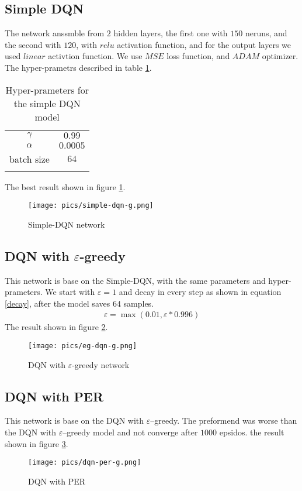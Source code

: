 \documentclass{article}
\begin{document}
	\subsection{Simple DQN}
	The network anssmble from $ 2 $ hidden layers, the first one with $ 150 $ neruns, and the second with $ 120 $, with $ relu$  activation function, and for the output layers we used $ linear $ activtion function.  We use $ MSE $ loss function, and $ ADAM $ optimizer. The hyper-prametrs described in table \ref{simple-dqn-hp}.
	\begin{table}[h!]
		\centering
		\begin{tabular}{@{}cc@{}}
			\toprule
			$\gamma$   & $0.99$   \\ 
			$\alpha$   & $0.0005$ \\
			batch size & $64$       \\ \bottomrule \\
		\end{tabular}
		\caption{Hyper-prameters for the simple DQN model}
		\label{simple-dqn-hp}
	\end{table}
	The best result shown in figure \ref{SIMPLE-DQN}.
	\begin{figure}[h!]
		\begin{center}
			\texttt{[image: pics/simple-dqn-g.png]}
		\end{center}
		\caption{Simple-DQN network}
		\label{SIMPLE-DQN}
	\end{figure}
	\subsection{DQN with $\varepsilon$-greedy}
	This network is base on the Simple-DQN, with the same parameters and hyper-prameters. We start with $ \varepsilon =1 $ and decay in every step as shown in equation \ref{decay}, after the model saves $ 64 $ samples.
	\begin{gather}\label{decay}
	\varepsilon = \max (0.01, \varepsilon * 0.996)
	\end{gather}
	The result shown in figure \ref{eg-dqn}.
	\begin{figure}[]
		\begin{center}
			\texttt{[image: pics/eg-dqn-g.png]}
		\end{center}
		\caption{DQN with $\varepsilon$-greedy network}
		\label{eg-dqn}
	\end{figure}
	\newpage
	\subsection{DQN with PER}
	This network is base on the DQN with $ \varepsilon $--greedy. The preformend was worse than the DQN with $ \varepsilon $--greedy model and not converge after $ 1000 $ epsidos. the result shown in figure \ref{per-dqn}.
	\begin{figure}[h!]
		\begin{center}
			\texttt{[image: pics/dqn-per-g.png]}
		\end{center}
		\caption{DQN with PER}
		\label{per-dqn}
	\end{figure}
\end{document}
